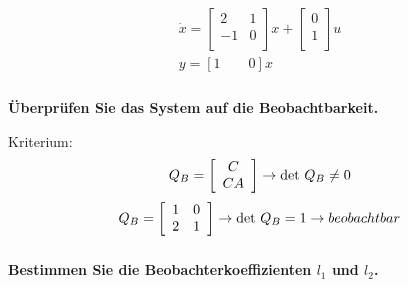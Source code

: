 \begin{equation}
    \begin{array}{l}
        \dot{x}=\left[\begin{array}{cc}
                2  & 1 \\
                -1 & 0 \\
            \end{array}\right]x+\left[\begin{array}{c}
                0 \\
                1 \\
            \end{array}\right]u \\
        y=\left[1\qquad 0\right]x
    \end{array}
\end{equation}
\subsubsection{}\textbf{Überprüfen Sie das System auf die Beobachtbarkeit.}

Kriterium:
\begin{equation}
    Q_B=\left[\begin{array}{c}
            C  \\
            CA \\
        \end{array}\right]\rightarrow\mathop{}\!\mathrm{det}\ Q_B\neq0
\end{equation}
\begin{equation}
    Q_B=\left[\begin{array}{cc}
            1 & 0 \\
            2 & 1 \\
        \end{array}\right]\rightarrow\mathop{}\!\mathrm{det}\ Q_B=1\rightarrow beobachtbar
\end{equation}
\subsubsection{}\textbf{Bestimmen Sie die Beobachterkoeffizienten $l_1$ und $l_2$.}

